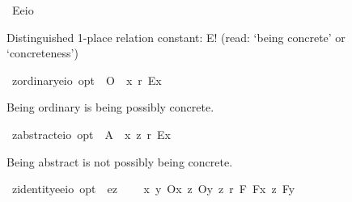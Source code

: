 \begin{isabellebody}
\isamarkuptrue%
\isamarkupfalse%
\ E{\isacharcolon}{\isacharcolon}{\isachardoublequoteopen}{\isacharparenleft}e{\isasymRightarrow}io{\isacharparenright}{\isachardoublequoteclose}%
\begin{isamarkuptext}%
Distinguished 1-place relation constant: E! (read: ‘being concrete’ or ‘concreteness’)%
\end{isamarkuptext}%
\isamarkuptrue%
\isamarkupfalse%
\ z{\isacharunderscore}ordinary{\isacharcolon}{\isacharcolon}{\isachardoublequoteopen}{\isacharparenleft}e{\isasymRightarrow}io{\isacharparenright}\ opt{\isachardoublequoteclose}\ \ {\isachardoublequoteopen}O\isactrlsup {\isacharbang}\ {\isasymequiv}\ {\isasymlambda}x{\isachardot}\ {\isasymdiamond}\isactrlsup r\ {\isacharless}{\isachardot}E{\isachardot}{\isasymbullet}{\isachardot}x{\isachardot}{\isachargreater}{\isacharparenright}{\isachardoublequoteclose}%
\begin{isamarkuptext}%
Being ordinary is being possibly concrete.%
\end{isamarkuptext}%
\isamarkuptrue%
\isamarkupfalse%
\ z{\isacharunderscore}abstract{\isacharcolon}{\isacharcolon}{\isachardoublequoteopen}{\isacharparenleft}e{\isasymRightarrow}io{\isacharparenright}\ opt{\isachardoublequoteclose}\ \ {\isachardoublequoteopen}A\isactrlsup {\isacharbang}\ {\isasymequiv}\ {\isasymlambda}x{\isachardot}\ {\isasymnot}\isactrlsup z\ {\isasymdiamond}\isactrlsup r\ {\isacharless}{\isachardot}E{\isachardot}{\isasymbullet}{\isachardot}x{\isachardot}{\isachargreater}{\isacharparenright}{\isachardoublequoteclose}%
\begin{isamarkuptext}%
Being abstract is not possibly being concrete.%
\end{isamarkuptext}%
\isamarkuptrue%
\isamarkupfalse%
\ z{\isacharunderscore}identity{\isacharcolon}{\isacharcolon}{\isachardoublequoteopen}{\isacharparenleft}e{\isasymRightarrow}e{\isasymRightarrow}io{\isacharparenright}\ opt{\isachardoublequoteclose}\ \ {\isachardoublequoteopen}{\isacharequal}\isactrlsub e\isactrlsup z\ {\isasymequiv}\ \isanewline
\ \ {\isasymlambda}x\ y{\isachardot}\ {\isacharparenleft}{\isacharparenleft}{\isacharless}O\isactrlsup {\isacharbang}{\isasymbullet}{\isachardot}x{\isachardot}{\isachargreater}\ {\isasymand}\isactrlsup z\ {\isacharless}O\isactrlsup {\isacharbang}{\isasymbullet}{\isachardot}y{\isachardot}{\isachargreater}{\isacharparenright}\ {\isasymand}\isactrlsup z\ {\isasymbox}\isactrlsup r\ {\isacharparenleft}{\isasymforall}{\isacharparenleft}{\isasymlambda}F{\isachardot}\ {\isacharless}{\isachardot}F{\isachardot}{\isasymbullet}{\isachardot}x{\isachardot}{\isachargreater}\ {\isasymequiv}\isactrlsup z\ {\isacharless}{\isachardot}F{\isachardot}{\isasymbullet}{\isachardot}y{\isachardot}{\isachargreater}{\isacharparenright}{\isacharparenright}{\isacharparenright}{\isacharparenright}{\isachardoublequoteclose}\isanewline

\end{isabellebody}
